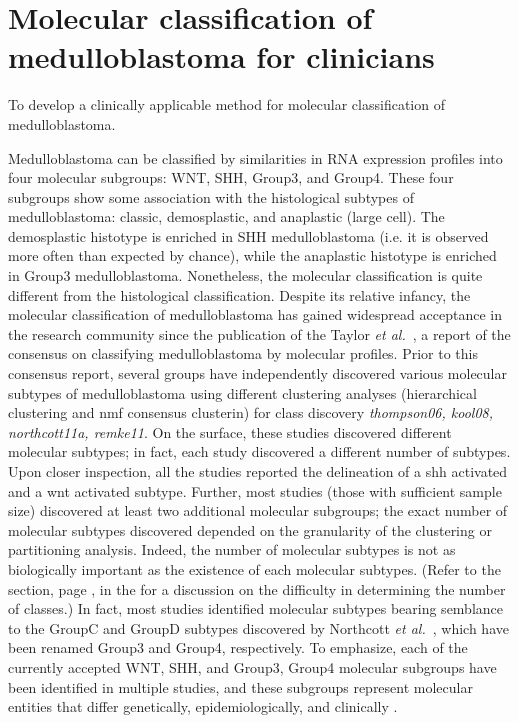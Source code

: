 \chapter{Molecular classification of medulloblastoma for clinicians}
\label{ch:mb-class}

\begin{objective}
To develop a clinically applicable method for molecular classification of medulloblastoma.
\end{objective}

Medulloblastoma can be classified by similarities in RNA expression profiles into four molecular subgroups: WNT, SHH, Group3, and Group4. These four subgroups show some association with the histological subtypes of medulloblastoma: classic, demosplastic, and anaplastic (large cell). The demosplastic histotype is enriched in SHH medulloblastoma (i.e. it is observed more often than expected by chance), while the anaplastic histotype is enriched in Group3 medulloblastoma. Nonetheless, the molecular classification is quite different from the histological classification. Despite its relative infancy, the molecular classification of medulloblastoma has gained widespread acceptance in the research community since the publication of the Taylor \emph{et al.}\ , a report of the consensus on classifying medulloblastoma by molecular profiles. Prior to this consensus report, several groups have independently discovered various molecular subtypes of medulloblastoma using different clustering analyses (hierarchical clustering and \gls{nmf} consensus clusterin) for class discovery \emph{thompson06, kool08, northcott11a, remke11}. On the surface, these studies discovered different molecular subtypes; in fact, each study discovered a different number of subtypes. Upon closer inspection, all the studies reported the delineation of a \gls{shh} activated and a \gls{wnt} activated subtype. Further, most studies (those with sufficient sample size) discovered at least two additional molecular subgroups; the exact number of molecular subtypes discovered depended on the granularity of the clustering or partitioning analysis. Indeed, the number of molecular subtypes is not as biologically important as the existence of each molecular subtypes. (Refer to the  section, page \pageref{sec:classification}, in the  for a discussion on the difficulty in determining the number of classes.) In fact, most studies identified molecular subtypes bearing semblance to the GroupC and GroupD subtypes discovered by Northcott \emph{et al.}\ , which have been renamed Group3 and Group4, respectively. To emphasize, each of the currently accepted WNT, SHH, and Group3, Group4 molecular subgroups have been identified in multiple studies, and these subgroups represent molecular entities that differ genetically, epidemiologically, and clinically .

